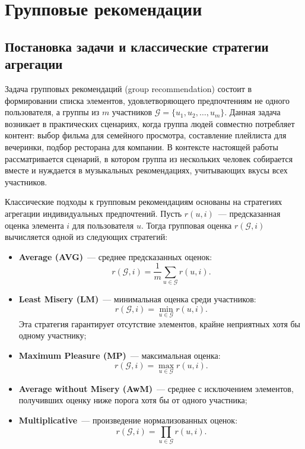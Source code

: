 \section{Групповые рекомендации}

\subsection{Постановка задачи и классические стратегии агрегации}

Задача групповых рекомендаций (group recommendation) состоит в формировании списка элементов, удовлетворяющего предпочтениям не одного пользователя, а группы из $m$ участников $\mathcal{G} = \{u_1, u_2, \ldots, u_m\}$. Данная задача возникает в практических сценариях, когда группа людей совместно потребляет контент: выбор фильма для семейного просмотра, составление плейлиста для вечеринки, подбор ресторана для компании. В контексте настоящей работы рассматривается сценарий, в котором группа из нескольких человек собирается вместе и нуждается в музыкальных рекомендациях, учитывающих вкусы всех участников.

Классические подходы к групповым рекомендациям основаны на стратегиях агрегации индивидуальных предпочтений. Пусть $r(u, i)$~--- предсказанная оценка элемента $i$ для пользователя $u$. Тогда групповая оценка $r(\mathcal{G}, i)$ вычисляется одной из следующих стратегий:

\begin{itemize}
    \item \textbf{Average (AVG)}~--- среднее предсказанных оценок:
    \[
        r(\mathcal{G}, i) = \frac{1}{m}\sum_{u \in \mathcal{G}} r(u, i).
    \]
    \item \textbf{Least Misery (LM)}~--- минимальная оценка среди участников:
    \[
        r(\mathcal{G}, i) = \min_{u \in \mathcal{G}} r(u, i).
    \]
    Эта стратегия гарантирует отсутствие элементов, крайне неприятных хотя бы одному участнику;
    \item \textbf{Maximum Pleasure (MP)}~--- максимальная оценка:
    \[
        r(\mathcal{G}, i) = \max_{u \in \mathcal{G}} r(u, i).
    \]
    \item \textbf{Average without Misery (AwM)}~--- среднее с исключением элементов, получивших оценку ниже порога хотя бы от одного участника;
    \item \textbf{Multiplicative}~--- произведение нормализованных оценок:
    \[
        r(\mathcal{G}, i) = \prod_{u \in \mathcal{G}} r(u, i).
    \]
\end{itemize}

